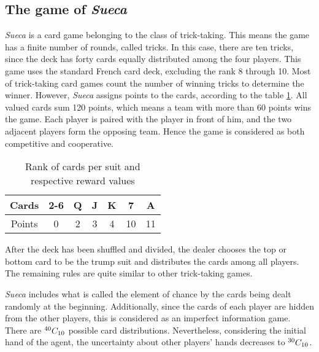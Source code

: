 \subsection{The game of \emph{Sueca}}

\emph{Sueca} is a card game belonging to the class of trick-taking.
This means the game has a finite number of rounds, called tricks.
In this case, there are ten tricks, since the deck has forty cards equally distributed among the four players.
This game uses the standard French card deck, excluding the rank 8 through 10.
Most of trick-taking card games count the number of winning tricks to determine the winner.
However, \emph{Sueca} assigns points to the cards, according to the table \ref{points-table}.
All valued cards sum 120 points, which means a team with more than 60 points wins the game.
Each player is paired with the player in front of him, and the two adjacent players form the opposing team.
Hence the game is considered as both competitive and cooperative.

\begin{table}[ht]
\centering
\begin{tabular}{|c|c|c|c|c|c|c|}
\hline
Cards  & 2-6 & Q & J & K & 7  & A  \\ \hline
Points & 0   & 2 & 3 & 4 & 10 & 11 \\ \hline
\end{tabular}
\caption{Rank of cards per suit and respective reward values}
\label{points-table}
\end{table}

After the deck has been shuffled and divided, the dealer chooses the top or bottom card to be the trump suit and distributes the cards among all players.
The remaining rules are quite similar to other trick-taking games.

\emph{Sueca} includes what is called the element of chance by the cards being dealt randomly at the beginning.
Additionally, since the cards of each player are hidden from the other players, this is considered as an imperfect information game.
There are ${}^{40}C_{10}$ possible card distributions.
Nevertheless, considering the initial hand of the agent, the uncertainty about other players' hands decreases to ${}^{30}C_{10}$.